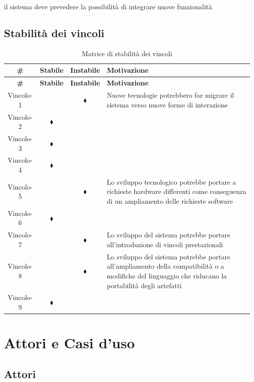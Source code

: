	\item il sistema deve prevedere la possibilità di integrare nuove funzionalità
\vincoliend

\subsection{Stabilità dei vincoli}

\begin{longtable}{|c|c|c|p{7cm}|}
\caption{Matrice di stabilità dei vincoli}\label{tab:stabilita-vincoli}\\
\hline\hline
\rowcolor{grigio-chiarissimo} \textbf{\#} & \textbf{Stabile} & \textbf{Instabile} & \textbf{Motivazione} \\
\hline\hline
\endfirsthead
\hline\hline
\rowcolor{grigio-chiarissimo} \textbf{\#} & \textbf{Stabile} & \textbf{Instabile} & \textbf{Motivazione} \\
\hline\hline
\endhead

Vincolo-1 &  & $\blacklozenge$ & Nuove tecnologie potrebbero far migrare il sistema verso nuove forme di interazione \\ 
\hline 
Vincolo-2 & $\blacklozenge$ &  &  \\ 
\hline 
Vincolo-3 & $\blacklozenge$ & & \\ 
\hline 
Vincolo-4 & $\blacklozenge$ & & \\ 
\hline 
Vincolo-5 &  & $\blacklozenge$ & Lo sviluppo tecnologico potrebbe portare a richieste hardware differenti come conseguenza di un ampliamento delle richieste software \\ 
\hline 
Vincolo-6 & $\blacklozenge$ & & \\ 
\hline 
Vincolo-7 & & $\blacklozenge$ & Lo sviluppo del sistema potrebbe portare all'introduzione di vincoli prestazionali \\ 
\hline 
Vincolo-8 & & $\blacklozenge$ & Lo sviluppo del sistema potrebbe portare all'ampliamento della compatibilità o a modifiche del linguaggio che riducano la portabilità degli artefatti\\ 
\hline 
Vincolo-9 & $\blacklozenge$ & & \\ 
\hline

\end{longtable}


\section{Attori e Casi d'uso}

\subsection{Attori}

